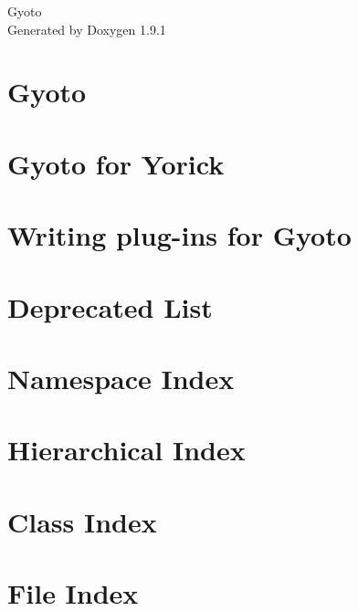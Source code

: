 \let\mypdfximage\pdfximage\def\pdfximage{\immediate\mypdfximage}\documentclass[twoside]{book}
\newcommand{\+}{\discretionary{\mbox{\scriptsize$\hookleftarrow$}}{}{}}
\newcommand{\clearemptydoublepage}{%
  \newpage{\pagestyle{empty}\cleardoublepage}%
}
\begin{document}
\raggedbottom

\hypersetup{pageanchor=false,
             bookmarksnumbered=true,
             pdfencoding=unicode
            }
\begin{titlepage}
\vspace*{7cm}
\begin{center}%
{\Large Gyoto }\\
\vspace*{1cm}
{\large Generated by Doxygen 1.9.1}\\
\end{center}
\end{titlepage}
\clearemptydoublepage
{}
\tableofcontents
\clearemptydoublepage
{}
\hypersetup{pageanchor=true}

\chapter{Gyoto}
\label{index}\hypertarget{index}{}
\chapter{Gyoto for Yorick}
\label{yorick_plugin_page}

\chapter{Writing plug-\/ins for Gyoto}
\label{writing_plugins_page}

\chapter{Deprecated List}
\label{deprecated}

\chapter{Namespace Index}

\chapter{Hierarchical Index}

\chapter{Class Index}

\chapter{File Index}

\end{document}
